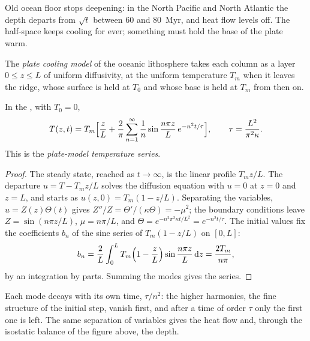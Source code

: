Old ocean floor stops deepening: in the North Pacific and North Atlantic the
depth departs from $\sqrt t$ between 60 and \qty{80}{Myr}, and heat flow levels
off. The half-space keeps cooling for ever; something must hold the base of the
plate warm.

\begin{definition}\label{def:b3:lithosphere-thermal-models:plate}
The \emph{plate cooling model} of the oceanic
lithosphere takes each column as a layer $0 \le z \le L$ of uniform
diffusivity, at the uniform temperature $T_m$ when it leaves the ridge, whose
surface is held at $T_0$ and whose base is held at $T_m$ from then on.
\end{definition}

\begin{theorem}\label{thm:b3:lithosphere-thermal-models:plate-series}
In the , with $T_0 = 0$,
\[
  T(z, t) = T_m\Bigl[\frac zL + \frac2\pi\sum_{n=1}^\infty\frac1n
  \sin\frac{n\pi z}{L}\,e^{-n^2t/\tau}\Bigr],\qquad
  \tau = \frac{L^2}{\pi^2\kappa} .
\]
This is the \emph{plate-model temperature series}.
\end{theorem}

\begin{proof}
The steady state, reached as $t \to \infty$, is the linear profile $T_mz/L$.
The departure $u = T - T_mz/L$ solves the diffusion equation with $u = 0$ at
$z = 0$ and $z = L$, and starts as $u(z, 0) = T_m(1 - z/L)$. Separating the
variables, $u = Z(z)\Theta(t)$ gives $Z''/Z = \Theta'/(\kappa\Theta) = -\mu^2$;
the boundary conditions leave $Z = \sin(n\pi z/L)$, $\mu = n\pi/L$, and
$\Theta = e^{-n^2\pi^2\kappa t/L^2} = e^{-n^2t/\tau}$. The initial values fix the
coefficients $b_n$ of the sine series of $T_m(1 - z/L)$ on $[0, L]$:
\[
  b_n = \frac2L\int_0^LT_m\Bigl(1 - \frac zL\Bigr)\sin\frac{n\pi z}{L}\,\mathrm dz
  = \frac{2T_m}{n\pi},
\]
by an integration by parts. Summing the modes gives the series.
\end{proof}

Each mode decays with its own time, $\tau/n^2$: the higher harmonics, the fine
structure of the initial step, vanish first, and after a time of order $\tau$
only the first one is left. The same separation of variables gives the heat
flow and, through the isostatic balance of the figure above, the depth.

